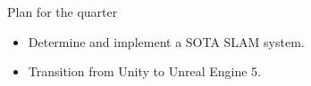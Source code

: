 




\begin{frame}{Plan for the quarter}
    \begin{itemize}
        \item Determine and implement a SOTA SLAM system.
        \item Transition from Unity to Unreal Engine 5.
    \end{itemize}    
\end{frame}

